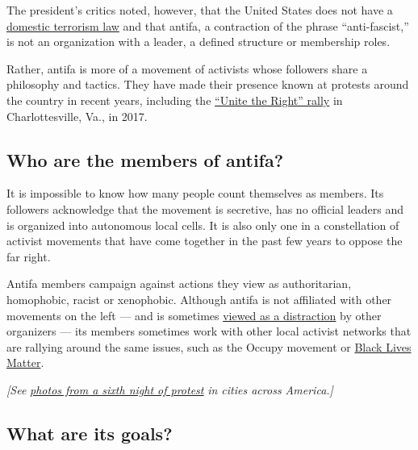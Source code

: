 The president's critics noted, however, that the United States does not
have a
\href{https://www.nytimes3xbfgragh.onion/2019/08/07/us/domestic-terror-law.html}{domestic
terrorism law} and that antifa, a contraction of the phrase
``anti-fascist,'' is not an organization with a leader, a defined
structure or membership roles.

Rather, antifa is more of a movement of activists whose followers share
a philosophy and tactics. They have made their presence known at
protests around the country in recent years, including the
\href{https://www.nytimes3xbfgragh.onion/2017/08/13/us/charlottesville-protests-unite-the-right.html}{``Unite
the Right'' rally} in Charlottesville, Va., in 2017.

\hypertarget{who-are-the-members-of-antifa}{%
\subsection{Who are the members of
antifa?}\label{who-are-the-members-of-antifa}}

It is impossible to know how many people count themselves as members.
Its followers acknowledge that the movement is secretive, has no
official leaders and is organized into autonomous local cells. It is
also only one in a constellation of activist movements that have come
together in the past few years to oppose the far right.

Antifa members campaign against actions they view as authoritarian,
homophobic, racist or xenophobic. Although antifa is not affiliated with
other movements on the left --- and is sometimes
\href{https://www.nytimes3xbfgragh.onion/2017/08/28/opinion/antifa-trump-charlottesville.html}{viewed
as a distraction} by other organizers --- its members sometimes work
with other local activist networks that are rallying around the same
issues, such as the Occupy movement or
\href{https://news.vice.com/en_us/article/7xqjv9/neo-nazis-are-giving-black-lives-matter-and-antifa-a-reason-to-work-together}{Black
Lives Matter}.

\emph{{[}See}
\href{https://www.nytimes3xbfgragh.onion/article/pictures-george-floyd-protests-photos.html}{\emph{photos
from a sixth night of protest}} \emph{in cities across America.{]}}

\hypertarget{what-are-its-goals}{%
\subsection{What are its goals?}\label{what-are-its-goals}}

